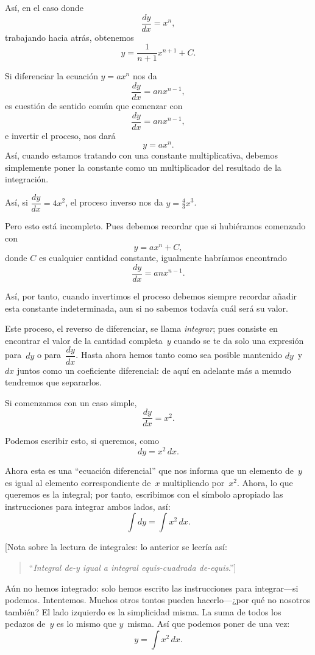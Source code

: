 \documentclass[12pt]{book}[2005/09/16]
\newcommand{\DPPageSep}[2]{\Pagelabel{#2}}
\newcommand{\Pagelabel}[1]
  {\phantomsection\label{#1}}
\begin{document}
Así, en el caso donde
\[
\frac{dy}{dx} = x^n,
\]
trabajando hacia atrás, obtenemos
\[
y = \frac{1}{n + 1} x^{n+1} + C.
\]

Si diferenciar la ecuación $y = ax^n$ nos da
\[
\frac{dy}{dx} = anx^{n-1},
\]
es cuestión de sentido común que comenzar con
\[
\frac{dy}{dx} = anx^{n-1},
\]
e invertir el proceso, nos dará
\[
y = ax^n.
\]
Así, cuando estamos tratando con una constante multiplicativa,
debemos simplemente poner la constante como un multiplicador del
resultado de la integración.
\DPPageSep{205.png}{193}%

Así, si $\dfrac{dy}{dx} = 4x^2$, el proceso inverso nos da
$y = \frac{4}{3}x^3$.

Pero esto está incompleto. Pues debemos recordar
que si hubiéramos comenzado con
\[
y = ax^n + C,
\]
donde $C$ es cualquier cantidad constante, igualmente habríamos encontrado
\[
\frac{dy}{dx} = anx^{n-1}.
\]

Así, por tanto, cuando invertimos el proceso debemos
siempre recordar añadir esta constante indeterminada,
aun si no sabemos todavía cuál será su valor.

Este proceso, el reverso de diferenciar, se llama
\emph{integrar}; pues consiste en encontrar el valor de
la cantidad completa~$y$ cuando se te da solo una
expresión para~$dy$ o para~$\dfrac{dy}{dx}$. Hasta ahora hemos tanto
como sea posible mantenido $dy$~y~$dx$ juntos como un coeficiente
diferencial: de aquí en adelante más a menudo
tendremos que separarlos.

Si comenzamos con un caso simple,
\[
\frac{dy}{dx} = x^2.
\]

Podemos escribir esto, si queremos, como
\[
dy = x^2\, dx.
\]

Ahora esta es una ``ecuación diferencial'' que nos informa
que un elemento de~$y$ es igual al elemento correspondiente
de~$x$ multiplicado por~$x^2$. Ahora, lo que queremos
\DPPageSep{206.png}{194}%
es la integral; por tanto, escribimos con el símbolo apropiado
las instrucciones para integrar ambos lados, así:
\[
\int dy = \int x^2\, dx.
\]

[Nota sobre la lectura de integrales: lo anterior se leería
así:
\begin{quote}
``\emph{Integral de-y \emph{igual a} integral equis-cuadrada de-equis}.'']
\end{quote}

Aún no hemos integrado: solo hemos escrito
las instrucciones para integrar---si podemos. Intentemos.
Muchos otros tontos pueden hacerlo---¿por qué no nosotros
también? El lado izquierdo es la simplicidad misma. La
suma de todos los pedazos de~$y$ es lo mismo que $y$~misma.
Así que podemos poner de una vez:
\[
y = \int x^2\, dx.
\]
\end{document}
